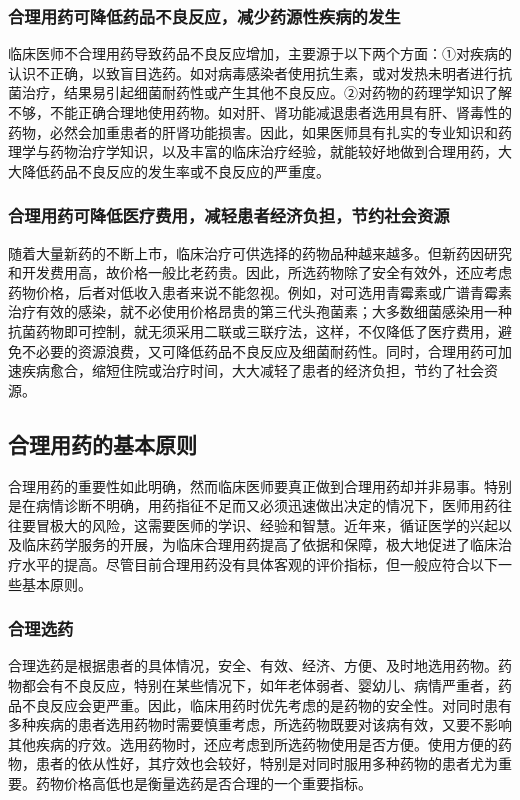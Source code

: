 \subsubsection{合理用药可降低药品不良反应，减少药源性疾病的发生}

临床医师不合理用药导致药品不良反应增加，主要源于以下两个方面：①对疾病的认识不正确，以致盲目选药。如对病毒感染者使用抗生素，或对发热未明者进行抗菌治疗，结果易引起细菌耐药性或产生其他不良反应。②对药物的药理学知识了解不够，不能正确合理地使用药物。如对肝、肾功能减退患者选用具有肝、肾毒性的药物，必然会加重患者的肝肾功能损害。因此，如果医师具有扎实的专业知识和药理学与药物治疗学知识，以及丰富的临床治疗经验，就能较好地做到合理用药，大大降低药品不良反应的发生率或不良反应的严重度。

\subsubsection{合理用药可降低医疗费用，减轻患者经济负担，节约社会资源}

随着大量新药的不断上市，临床治疗可供选择的药物品种越来越多。但新药因研究和开发费用高，故价格一般比老药贵。因此，所选药物除了安全有效外，还应考虑药物价格，后者对低收入患者来说不能忽视。例如，对可选用青霉素或广谱青霉素治疗有效的感染，就不必使用价格昂贵的第三代头孢菌素；大多数细菌感染用一种抗菌药物即可控制，就无须采用二联或三联疗法，这样，不仅降低了医疗费用，避免不必要的资源浪费，又可降低药品不良反应及细菌耐药性。同时，合理用药可加速疾病愈合，缩短住院或治疗时间，大大减轻了患者的经济负担，节约了社会资源。

\subsection{合理用药的基本原则}

合理用药的重要性如此明确，然而临床医师要真正做到合理用药却并非易事。特别是在病情诊断不明确，用药指征不足而又必须迅速做出决定的情况下，医师用药往往要冒极大的风险，这需要医师的学识、经验和智慧。近年来，循证医学的兴起以及临床药学服务的开展，为临床合理用药提高了依据和保障，极大地促进了临床治疗水平的提高。尽管目前合理用药没有具体客观的评价指标，但一般应符合以下一些基本原则。

\subsubsection{合理选药}

合理选药是根据患者的具体情况，安全、有效、经济、方便、及时地选用药物。药物都会有不良反应，特别在某些情况下，如年老体弱者、婴幼儿、病情严重者，药品不良反应会更严重。因此，临床用药时优先考虑的是药物的安全性。对同时患有多种疾病的患者选用药物时需要慎重考虑，所选药物既要对该病有效，又要不影响其他疾病的疗效。选用药物时，还应考虑到所选药物使用是否方便。使用方便的药物，患者的依从性好，其疗效也会较好，特别是对同时服用多种药物的患者尤为重要。药物价格高低也是衡量选药是否合理的一个重要指标。

